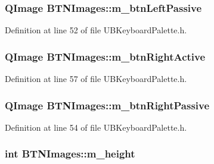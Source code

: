\hypertarget{class_b_t_n_images_a8c7ac2f0fafafc182448f31a2a2d5c96}{
\subsubsection[{m\-\_\-btn\-Left\-Passive}]{\setlength{\rightskip}{0pt plus 5cm}Q\-Image B\-T\-N\-Images\-::m\-\_\-btn\-Left\-Passive}}\label{d2/d5c/class_b_t_n_images_a8c7ac2f0fafafc182448f31a2a2d5c96}


Definition at line 52 of file U\-B\-Keyboard\-Palette.\-h.

\hypertarget{class_b_t_n_images_adec36f3b27903e8eed3a4d93cb93420e}{
\subsubsection[{m\-\_\-btn\-Right\-Active}]{\setlength{\rightskip}{0pt plus 5cm}Q\-Image B\-T\-N\-Images\-::m\-\_\-btn\-Right\-Active}}\label{d2/d5c/class_b_t_n_images_adec36f3b27903e8eed3a4d93cb93420e}


Definition at line 57 of file U\-B\-Keyboard\-Palette.\-h.

\hypertarget{class_b_t_n_images_af861c1d6ff7832db4c704d4757aa99a6}{
\subsubsection[{m\-\_\-btn\-Right\-Passive}]{\setlength{\rightskip}{0pt plus 5cm}Q\-Image B\-T\-N\-Images\-::m\-\_\-btn\-Right\-Passive}}\label{d2/d5c/class_b_t_n_images_af861c1d6ff7832db4c704d4757aa99a6}


Definition at line 54 of file U\-B\-Keyboard\-Palette.\-h.

\hypertarget{class_b_t_n_images_a28feb359bd5ad24d478d7bc69537c0ef}{
\subsubsection[{m\-\_\-height}]{\setlength{\rightskip}{0pt plus 5cm}int B\-T\-N\-Images\-::m\-\_\-height}}\label{d2/d5c/class_b_t_n_images_a28feb359bd5ad24d478d7bc69537c0ef}


